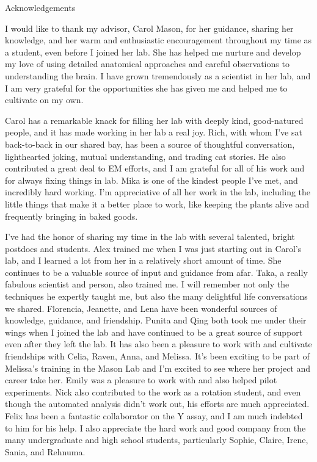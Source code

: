 {\centering
\LARGE
Acknowledgements
\par
}

I would like to thank my advisor, Carol Mason, for her guidance, sharing her knowledge, and her warm and enthusiastic encouragement throughout my time as a student, even before I joined her lab.
She has helped me nurture and develop my love of using detailed anatomical approaches and careful observations to understanding the brain.
I have grown tremendously as a scientist in her lab, and I am very grateful for the opportunities she has given me and helped me to cultivate on my own.

Carol has a remarkable knack for filling her lab with deeply kind, good-natured people, and it has made working in her lab a real joy.
Rich, with whom I've sat back-to-back in our shared bay, has been a source of thoughtful conversation, lighthearted joking, mutual understanding, and trading cat stories.
He also contributed a great deal to EM efforts, and I am grateful for all of his work and for always fixing things in lab.
Mika is one of the kindest people I've met, and incredibly hard working.
I'm appreciative of all her work in the lab, including the little things that make it a better place to work, like keeping the plants alive and frequently bringing in baked goods.

I've had the honor of sharing my time in the lab with several talented, bright postdocs and students.
Alex trained me when I was just starting out in Carol's lab, and I learned a lot from her in a relatively short amount of time.
She continues to be a valuable source of input and guidance from afar.
Taka, a really fabulous scientist and person, also trained me.
I will remember not only the \invitro{} techniques he expertly taught me, but also the many delightful life conversations we shared.
Florencia, Jeanette, and Lena have been wonderful sources of knowledge, guidance, and friendship.
Punita and Qing both took me under their wings when I joined the lab and have continued to be a great source of support even after they left the lab.
It has also been a pleasure to work with and cultivate friendships with Celia, Raven, Anna, and Melissa.
It's been exciting to be part of Melissa's training in the Mason Lab and I'm excited to see where her project and career take her.
Emily was a pleasure to work with and also helped pilot \invitro{} experiments.
Nick also contributed to the \invitro{} work as a rotation student, and even though the automated analysis didn't work out, his efforts are much appreciated.
Felix has been a fantastic collaborator on the Y assay, and I am much indebted to him for his help.
I also appreciate the hard work and good company from the many undergraduate and high school students, particularly Sophie, Claire, Irene, Sania, and Rehnuma.

